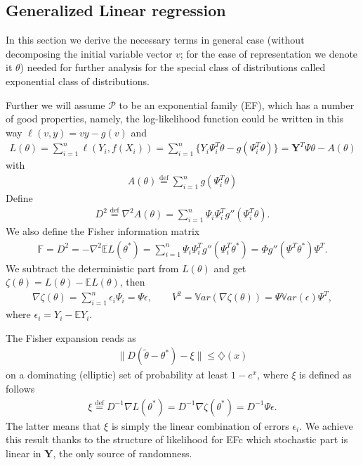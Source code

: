 \documentclass[12pt]{article}
\renewcommand{\=}[1]{\stackrel{#1}{=}} %
\providecommand{\e}{\epsilon}
\begin{document}
\subsection{Generalized Linear regression} 
In this section we derive the necessary terms in general case (without decomposing the initial variable vector $v$; for the ease of representation we denote it $\theta$) needed for further analysis for the special class of distributions called exponential class of distributions.  
\par Further we will assume $\mathcal{P}$ to be an exponential family (EF), which has a number of good properties, namely, the log-likelihood function could be written in this way $\ell(v, y) = vy - g(v)$ and 
\begin{align}
L(\theta) = \sum_{i=1}^n \ell(Y_i, f(X_i)) = \sum_{i=1}^n \{ Y_i \Psi_i^T \theta - g(\Psi_i^T \theta) \} = \mathbf{Y}^T \Psi \theta - A(\theta)
\end{align}
with 
\begin{align}
A(\theta) \stackrel{\text{def}}{=} \sum_{i=1}^n g(\Psi_i^T \theta)
\end{align}
Define 
\begin{align}
D^2 \stackrel{\text{def}}{=} \nabla^2 A(\theta) = \sum_{i=1}^n \Psi_i \Psi_i^T g''(\Psi_i^T \theta).
\end{align}
We also define the Fisher information matrix
\begin{eqnarray}
\mathbb{F} = D^2 = - \nabla^2 \mathbb{E} L(\theta^*) = \sum_{i=1}^n \Psi_i \Psi_i^T g''(\Psi_i^T \theta^*) = \Phi g''(\Psi^T \theta^*) \Psi^T. 
\end{eqnarray}
We subtract the deterministic part from $L(\theta)$ and get $\zeta(\theta) = L(\theta) - \mathbb{E} L(\theta)$, then 
\begin{eqnarray}
\nabla \zeta(\theta) = \sum_{i=1}^n \e_i \Psi_i = \Psi \e, \qquad V^2 = \mathbb{V}ar\left(\nabla \zeta(\theta)\right) = \Psi \mathbb{V}ar(\e) \Psi^T,
\end{eqnarray}
where $\e_i = Y_i - \mathbb{E} Y_i$.
\par The Fisher expansion reads as 
\begin{align}
\| D(\tilde{\theta} - \theta^*) - \xi \| \le \diamondsuit(x) 
\end{align}
on a dominating (elliptic) set of probability at least $1 - e^{x}$, where $\xi$ is defined as follows 
\begin{align}
\xi \stackrel{\text{def}}{=}  D^{-1} \nabla L(\theta^*) = D^{-1} \nabla \zeta(\theta^*) =D^{-1}\Psi \e.
\end{align}
The latter means that $\xi$ is simply the linear combination of errors $\e_i$. We achieve this result thanks to the structure of likelihood for EFc which stochastic part is linear in $\mathbf{Y}$, the only source of randomness. 
\end{document}
